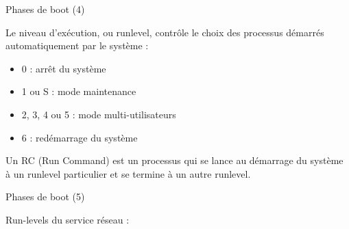 \documentclass[12pt, t]{beamer}
\newcommand{\bi}{\begin{itemize}}
\newcommand{\ei}{\end{itemize}}
\begin{document}
\begin{frame}{Phases de boot (4)}

    \vspace{15pt}
    Le niveau d'exécution, ou runlevel, contrôle le choix des processus
    démarrés automatiquement par le système :

    \vspace{8pt}
    \bi
    \itemsep8pt
    \item 0 : arrêt du système
    \item 1 ou S : mode maintenance
    \item 2, 3, 4 ou 5 : mode multi-utilisateurs
    \item 6 : redémarrage du système
    \ei

    {
        \vspace{8pt}
        Un RC (Run Command) est un processus qui se lance au démarrage du système
        à un runlevel particulier et se termine à un autre runlevel.
    }

\end{frame}


\begin{frame}{Phases de boot (5)}

    \vspace{30pt}
    Run-levels du service réseau :
    \vspace{10pt}
    \lstrc

\end{frame}
\end{document}
